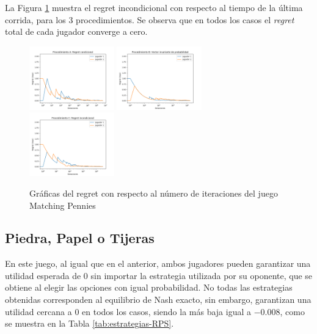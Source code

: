 La Figura \ref{fig:regret-matching-pennies} muestra el regret incondicional con respecto al tiempo de la última corrida, para los $3$ procedimientos. Se observa que en todos los casos el \textit{regret} total de cada jugador converge a cero.

\begin{figure}[ht]
\caption{Gráficas del regret con respecto al número de iteraciones del juego Matching Pennies}
\label{fig:regret-matching-pennies}
\centering
\includegraphics[width=0.327\textwidth]{graficas/matching-pennies/procedimiento-A.png}
\includegraphics[width=0.327\textwidth]{graficas/matching-pennies/procedimiento-B.png}
\includegraphics[width=0.327\textwidth]{graficas/matching-pennies/procedimiento-C.png}
\end{figure}

\subsection{Piedra, Papel o Tijeras}

En este juego, al igual que en el anterior, ambos jugadores pueden garantizar una utilidad esperada de $0$ sin importar la estrategia utilizada por su oponente, que se obtiene al elegir las opciones con igual probabilidad. No todas las estrategias obtenidas corresponden al equilibrio de Nash exacto, sin embargo, garantizan una utilidad cercana a $0$ en todos los casos, siendo la más baja igual a $-0.008$, como se muestra en la Tabla \ref{tab:estrategias-RPS}.

